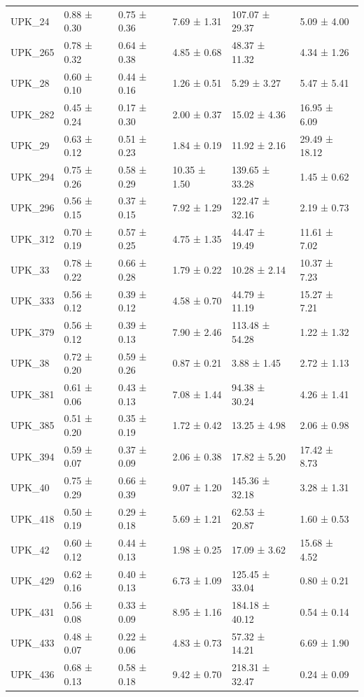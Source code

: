 \begin{tabular}{llllll}
UPK_24 & 0.88 ± 0.30 & 0.75 ± 0.36 & 7.69 ± 1.31 & 107.07 ± 29.37 & 5.09 ± 4.00 \\
UPK_265 & 0.78 ± 0.32 & 0.64 ± 0.38 & 4.85 ± 0.68 & 48.37 ± 11.32 & 4.34 ± 1.26 \\
UPK_28 & 0.60 ± 0.10 & 0.44 ± 0.16 & 1.26 ± 0.51 & 5.29 ± 3.27 & 5.47 ± 5.41 \\
UPK_282 & 0.45 ± 0.24 & 0.17 ± 0.30 & 2.00 ± 0.37 & 15.02 ± 4.36 & 16.95 ± 6.09 \\
UPK_29 & 0.63 ± 0.12 & 0.51 ± 0.23 & 1.84 ± 0.19 & 11.92 ± 2.16 & 29.49 ± 18.12 \\
UPK_294 & 0.75 ± 0.26 & 0.58 ± 0.29 & 10.35 ± 1.50 & 139.65 ± 33.28 & 1.45 ± 0.62 \\
UPK_296 & 0.56 ± 0.15 & 0.37 ± 0.15 & 7.92 ± 1.29 & 122.47 ± 32.16 & 2.19 ± 0.73 \\
UPK_312 & 0.70 ± 0.19 & 0.57 ± 0.25 & 4.75 ± 1.35 & 44.47 ± 19.49 & 11.61 ± 7.02 \\
UPK_33 & 0.78 ± 0.22 & 0.66 ± 0.28 & 1.79 ± 0.22 & 10.28 ± 2.14 & 10.37 ± 7.23 \\
UPK_333 & 0.56 ± 0.12 & 0.39 ± 0.12 & 4.58 ± 0.70 & 44.79 ± 11.19 & 15.27 ± 7.21 \\
UPK_379 & 0.56 ± 0.12 & 0.39 ± 0.13 & 7.90 ± 2.46 & 113.48 ± 54.28 & 1.22 ± 1.32 \\
UPK_38 & 0.72 ± 0.20 & 0.59 ± 0.26 & 0.87 ± 0.21 & 3.88 ± 1.45 & 2.72 ± 1.13 \\
UPK_381 & 0.61 ± 0.06 & 0.43 ± 0.13 & 7.08 ± 1.44 & 94.38 ± 30.24 & 4.26 ± 1.41 \\
UPK_385 & 0.51 ± 0.20 & 0.35 ± 0.19 & 1.72 ± 0.42 & 13.25 ± 4.98 & 2.06 ± 0.98 \\
UPK_394 & 0.59 ± 0.07 & 0.37 ± 0.09 & 2.06 ± 0.38 & 17.82 ± 5.20 & 17.42 ± 8.73 \\
UPK_40 & 0.75 ± 0.29 & 0.66 ± 0.39 & 9.07 ± 1.20 & 145.36 ± 32.18 & 3.28 ± 1.31 \\
UPK_418 & 0.50 ± 0.19 & 0.29 ± 0.18 & 5.69 ± 1.21 & 62.53 ± 20.87 & 1.60 ± 0.53 \\
UPK_42 & 0.60 ± 0.12 & 0.44 ± 0.13 & 1.98 ± 0.25 & 17.09 ± 3.62 & 15.68 ± 4.52 \\
UPK_429 & 0.62 ± 0.16 & 0.40 ± 0.13 & 6.73 ± 1.09 & 125.45 ± 33.04 & 0.80 ± 0.21 \\
UPK_431 & 0.56 ± 0.08 & 0.33 ± 0.09 & 8.95 ± 1.16 & 184.18 ± 40.12 & 0.54 ± 0.14 \\
UPK_433 & 0.48 ± 0.07 & 0.22 ± 0.06 & 4.83 ± 0.73 & 57.32 ± 14.21 & 6.69 ± 1.90 \\
UPK_436 & 0.68 ± 0.13 & 0.58 ± 0.18 & 9.42 ± 0.70 & 218.31 ± 32.47 & 0.24 ± 0.09 \\

\end{tabular}

